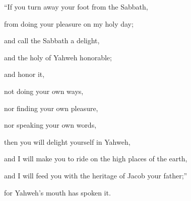 {\par }{\BB \par }{\Q {}“If you turn away your foot from the Sabbath,
\par }{\QB from doing your pleasure on my holy day;
\par }{\Q and call the Sabbath a delight,
\par }{\QB and the holy of Yahweh honorable;
\par }{\QB and honor it,
\par }{\QB not doing your own ways,
\par }{\QB nor finding your own pleasure,
\par }{\QB nor speaking your own words,
\par }{\Q {}then you will delight yourself in Yahweh,
\par }{\QB and I will make you to ride on the high places of the earth,
\par }{\QB and I will feed you with the heritage of Jacob your father;”
\par }{\QB for Yahweh’s mouth has spoken it.

}

